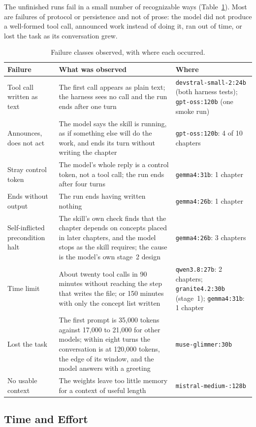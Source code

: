 \documentclass[11pt]{article}
\newcommand{\mdl}[1]{\texttt{#1}}
\newcommand{\Qeight}{\mdl{qwen3.8:27b}}
\newcommand{\Gthirtyone}{\mdl{gemma4:31b}}
\newcommand{\Muse}{\mdl{muse-\allowbreak glimmer:30b}}
\newcommand{\Gtwentysix}{\mdl{gemma4:26b}}
\newcommand{\Mistral}{\mdl{mistral-\allowbreak medium-\allowbreak 3.5:128b}}
\newcommand{\Gptoss}{\mdl{gpt-oss:120b}}
\newcommand{\Devstral}{\mdl{devstral-\allowbreak small-2:24b}}
\newcommand{\Granite}{\mdl{granite4.2:30b}}
\begin{document}
The unfinished runs fail in a small number of recognizable ways (Table~\ref{tab:failures}). Most are failures of protocol or persistence and not of prose: the model did not produce a well-formed tool call, announced work instead of doing it, ran out of time, or lost the task as its conversation grew.

\begin{table}[htbp]
\centering
\footnotesize
\begin{tabular}{@{}p{2.7cm}p{7.0cm}p{4.6cm}@{}}
\toprule
\textbf{Failure} & \textbf{What was observed} & \textbf{Where} \\
\midrule
Tool call written as text & The first call appears as plain text; the harness sees no call and the run ends after one turn & \Devstral{} (both harness tests); \Gptoss{} (one smoke run) \\
Announces, does not act & The model says the skill is running, as if something else will do the work, and ends its turn without writing the chapter & \Gptoss: 4 of 10 chapters \\
Stray control token & The model's whole reply is a control token, not a tool call; the run ends after four turns & \Gthirtyone: 1 chapter \\
Ends without output & The run ends having written nothing & \Gtwentysix: 1 chapter \\
Self-inflicted precondition halt & The skill's own check finds that the chapter depends on concepts placed in later chapters, and the model stops as the skill requires; the cause is the model's own stage~2 design & \Gtwentysix: 3 chapters \\
Time limit & About twenty tool calls in 90 minutes without reaching the step that writes the file; or 150 minutes with only the concept list written & \Qeight: 2 chapters; \Granite{} (stage~1); \Gthirtyone: 1 chapter \\
Lost the task & The first prompt is 35,000 tokens against 17,000 to 21,000 for other models; within eight turns the conversation is at 120,000 tokens, the edge of its window, and the model answers with a greeting & \Muse \\
No usable context & The weights leave too little memory for a context of useful length & \Mistral \\
\bottomrule
\end{tabular}
\caption{Failure classes observed, with where each occurred.}
\label{tab:failures}
\end{table}

\subsection{Time and Effort}
\end{document}
